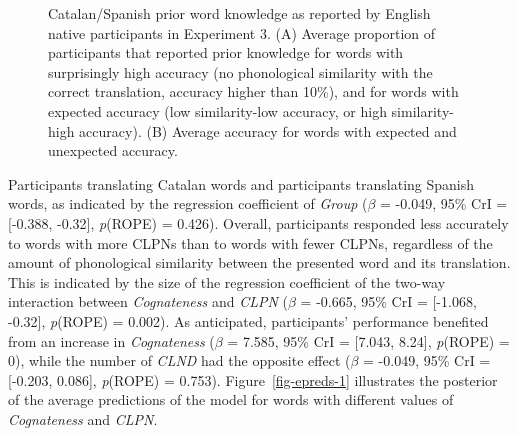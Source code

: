 \documentclass[
]{article}
\begin{document}
\begin{figure}


\caption{\label{fig-knowledge}Catalan/Spanish prior word knowledge as
reported by English native participants in Experiment 3. (A) Average
proportion of participants that reported prior knowledge for words with
surprisingly high accuracy (no phonological similarity with the correct
translation, accuracy higher than 10\%), and for words with expected
accuracy (low similarity-low accuracy, or high similarity-high
accuracy). (B) Average accuracy for words with expected and unexpected
accuracy.}

\end{figure}%

Participants translating Catalan words and participants translating
Spanish words, as indicated by the regression coefficient of
\emph{Group} (\(\beta\) = -0.049, 95\% CrI = {[}-0.388, -0.32{]},
\emph{p}(ROPE) = 0.426). Overall, participants responded less accurately
to words with more CLPNs than to words with fewer CLPNs, regardless of
the amount of phonological similarity between the presented word and its
translation. This is indicated by the size of the regression coefficient
of the two-way interaction between \emph{Cognateness} and \emph{CLPN}
(\(\beta\) = -0.665, 95\% CrI = {[}-1.068, -0.32{]}, \emph{p}(ROPE) =
0.002). As anticipated, participants' performance benefited from an
increase in \emph{Cognateness} (\(\beta\) = 7.585, 95\% CrI = {[}7.043,
8.24{]}, \emph{p}(ROPE) = 0), while the number of \emph{CLND} had the
opposite effect (\(\beta\) = -0.049, 95\% CrI = {[}-0.203, 0.086{]},
\emph{p}(ROPE) = 0.753). Figure~\ref{fig-epreds-1} illustrates the
posterior of the average predictions of the model for words with
different values of \emph{Cognateness} and \emph{CLPN}.
\end{document}
